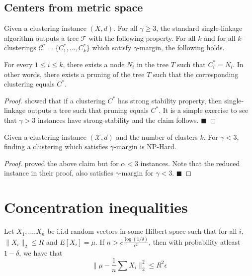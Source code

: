 \documentclass[orivec]{llncs}
\newcommand{\mc}{\mathcal}
\renewcommand{\qed}{\hfill\ensuremath{\blacksquare}}
\begin{document}
\subsection{Centers from metric space}
\begin{theorem}
\label{thm:upperCenterMetric}
Given a clustering instance $(X , d)$. For all $\gamma \ge 3$, the standard single-linkage algorithm outputs a tree $\mc T$ with the following property. For all $k$ and for all $k$-clusterings $\mc C^* = \{C_1^*, \ldots, C_k^* \}$ which satisfy $\gamma$-margin, the following holds.

For every $1 \le i \le k$, there exists a node $N_i$ in the tree $T$ such that $C_i^* = N_i$. In other words, there exists a pruning of the tree $T$ such that the corresponding clustering equals $C^*$. 
\end{theorem}

\begin{proof}
\cite{balcan2008discriminative} showed that if a clustering $C^*$ has strong stability property, then single-linkage outputs a tree such that pruning equals $C^*$. It is a simple exercise to see that $\gamma > 3$ instances have strong-stability and the claim follows.  
\qed
\end{proof}


\begin{theorem}
\label{thm:lowerCenterMetric}
Given a clustering instance $(\mc X, d)$ and the number of clusters $k$. For $\gamma < 3$, finding a clustering which satisfies $\gamma$-margin is NP-Hard.
\end{theorem}
\begin{proof}
\cite{awasthi2012center} proved the above claim but for $\alpha < 3$ instances. Note that the reduced instance in their proof, also satisfies $\gamma$-margin for $\gamma < 3$. 
\qed
\end{proof}

\section{Concentration inequalities}
\label{appendixsection:conIneq}

\begin{theorem}
\label{thm:genHoeff}
Let $X_1, \ldots. X_n$ be i.i.d random vectors in some Hilbert space such that for all $i$, $\|X_i\|_2 \le R$ and $E[X_i] = \mu$. If $n > c\frac{\log(1/\delta)}{\epsilon^2}$, then with probability atleast $1-\delta$, we have that
$$\Big\|\mu - \frac{1}{n}\sum X_i\Big\|_2^2 \le R^2\epsilon$$ 
\end{theorem}
\end{document}
